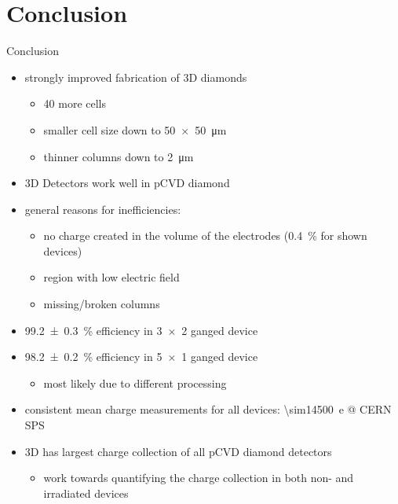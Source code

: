 \section{Conclusion}
\begin{frame}{Conclusion}

		\begin{itemize}\itemfill
			\item strongly improved fabrication of 3D diamonds
			\begin{itemize}
				\item \SI{40}{\times} more cells
				\item smaller cell size down to \SI{50x50}{\micro\meter}
				\item thinner columns down to \SI{2}{\micro\meter}\vspace*{2ex}
			\end{itemize}
			\item 3D Detectors work well in pCVD diamond
			\item general reasons for inefficiencies:
			\begin{itemize}
				\item no charge created in the volume of the electrodes (\SI{.4}{\%} for shown devices)
				\item region with low electric field
				\item missing/broken columns\vspace*{2ex}
			\end{itemize}
			\item \SI{99.2\pm .3}{\%} efficiency in \SI{3x2}{} ganged device
			\item \SI{98.2\pm .2}{\%} efficiency in \SI{5x1}{} ganged device
			\begin{itemize}
				\item most likely due to different processing\vspace*{2ex}
			\end{itemize}
			\item consistent mean charge measurements for all devices: \SI{\sim14500}{e} @ CERN SPS
			\item 3D has largest charge collection of all pCVD diamond detectors
			\begin{itemize}
				\item work towards quantifying the charge collection in both non- and irradiated devices
			\end{itemize}
		\end{itemize}
	
\end{frame}
